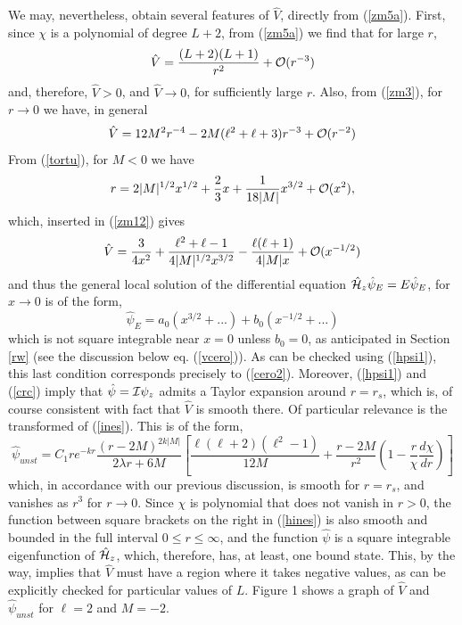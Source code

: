\documentclass[aps,floats,showpacs,amssymb,tightenlines]{revtex4}
\def\I{{\cal I}}
\begin{document}
We may, nevertheless, obtain several features of $\hat V$, directly from  (\ref{zm5a}). First, since $\chi$ is a polynomial of degree $L+2$, from (\ref{zm5a}) we find that for large $r$,
\begin{equation}\label{zm11a}
\hat V = \frac{(L+2)(L+1)}{r^2} + {\cal{O}}(r^{-3})
\end{equation}
and, therefore, $\hat V > 0$, and $\hat V \to 0$, for sufficiently large $r$. Also,
from (\ref{zm3}), for $r \to 0$ we have, in general
\begin{equation}\label{zm11}
\hat V = 12 M^2 r^{-4} -2 M (\ell^2+\ell+3) r^{-3} +{\cal{O}}(r^{-2})
\end{equation}
From (\ref{tortu}),  for $M<0$ we have
\begin{equation}\label{zm12}
r = 2 |M|^{1/2} x^{1/2}+\frac{2}{3} x +\frac{1}{18 |M|} x^{3/2}+{\cal{O}}(x^{2}),
\end{equation}
which, inserted in (\ref{zm12})  gives
\begin{equation}\label{zm13}
\hat V = \frac{3}{4 x^2} +\frac{\ell^2+\ell-1}{4|M|^{1/2}x^{3/2}} -\frac{\ell(\ell+1)}{4 |M|x} +{\cal{O}}(x^{-1/2})
\end{equation}
and
thus the general local solution of the differential equation $\hat {\cal H}_z \hat \psi_E = E \hat \psi_E$, for $x \to 0$ is of the form,
\begin{equation}
\hat \psi_E = a_0 \left( x^{3/2} + ... \right)  + b_0 \left(  x^{-1/2} + ... \right)
\end{equation}
which is not square integrable near $x=0$ unless $b_0=0$, as anticipated in Section \ref{rw} (see the discussion below eq. (\ref{vcero})).
As can be checked using (\ref{hpsi1}), this last condition
corresponds precisely to (\ref{cero2}).  Moreover, (\ref{hpsi1}) and (\ref{crc}) imply that $\hat \psi = \I \psi_z$ admits a Taylor
expansion around $r=r_s$, which is, of course consistent with fact that $\hat V$ is smooth there. Of particular relevance is the transformed of (\ref{ines}). This is of the form,
\begin{equation}\label{hines}
\hat \psi _{unst}  = C_1 r{e^{-kr}} \frac{\left( r-2M \right) ^{2 k |M|}}{2 \lambda r + 6M} \left[\frac{\ell(\ell+2)(\ell^2-1)}{12M}+\frac{r-2M}{r^2} \left(1 -\frac{r}{ \chi}\frac{d \chi}{dr}\right)\right]
\end{equation}
which, in accordance with our previous discussion, is smooth for $r=r_s$, and vanishes as $r^3$ for $ r \to 0$. Since $\chi$ is polynomial that does not vanish in $r > 0$, the function between square brackets on the right in (\ref{hines}) is also smooth and bounded in the full interval $0 \leq r \leq \infty$, and the function $\hat \psi$ is a square integrable eigenfunction of $\hat {\cal H}_z$, which, therefore, has, at least, one bound state. This, by the way, implies that $\hat V$ must have a region where it takes negative values, as can be explicitly checked for particular values of $L$. Figure 1 shows a graph of $\hat V$ and $\hat \psi _{unst}$ for $\ell=2$ and $M=-2$.\\
\end{document}
